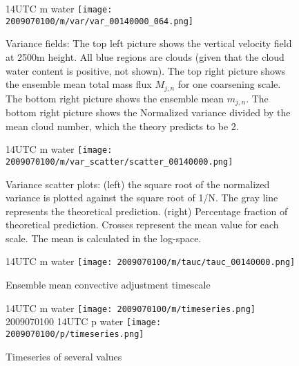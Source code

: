 \documentclass[a4paper, 12pt]{article}
\begin{document}
\begin{figure}[ht] \label{fig:case1_var_fields}
\noindent {} 14UTC m water
\texttt{[image: 2009070100/m/var/var\_00140000\_064.png]}\\
\caption{Variance fields:  The top left picture shows the vertical velocity field at 2500m height. All blue regions are clouds (given that the cloud water content is positive, not shown). The top right picture shows the ensemble mean total mass flux $M_{j,n}$ for one coarsening scale. The bottom right picture shows the ensemble mean $m_{j,n}$. The bottom right picture shows the Normalized variance divided by the mean cloud number, which the theory predicts to be 2.}
\end{figure}

\begin{figure}[ht] \label{fig:case1_var_scatter}
\noindent {} 14UTC m water
\texttt{[image: 2009070100/m/var\_scatter/scatter\_00140000.png]}\\
\caption{Variance scatter plots: (left) the square root of the normalized variance is plotted against the square root of 1/N. The gray line represents the theoretical prediction. (right) Percentage fraction of theoretical prediction. Crosses represent the mean value for each scale. The mean is calculated in the log-space.}
\end{figure}

\begin{figure}[ht] \label{fig:case1_tau_c}
\noindent {} 14UTC m water
\texttt{[image: 2009070100/m/tauc/tauc\_00140000.png]}\\
\caption{Ensemble mean convective adjustment timescale}
\end{figure}

\begin{figure}[ht] \label{fig:case1_timeseries}
\noindent {} 14UTC m water
\texttt{[image: 2009070100/m/timeseries.png]}\\
2009070100 14UTC p water
\texttt{[image: 2009070100/p/timeseries.png]}\\
\caption{Timeseries of several values}
\end{figure}
\end{document}
